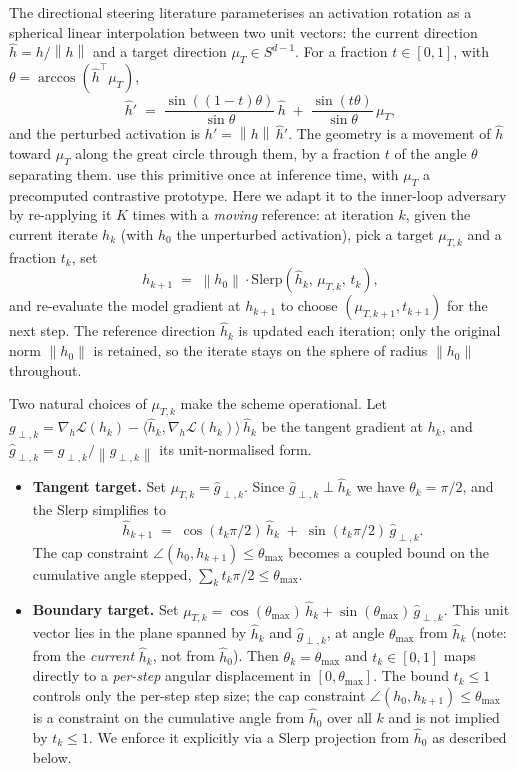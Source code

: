 \documentclass[11pt]{article}
\newcommand{\hh}{\hat h}
\newcommand{\thmax}{\theta_{\max}}
\newcommand{\norm}[1]{\left\lVert#1\right\rVert}
\newcommand{\inner}[2]{\langle #1, #2 \rangle}
\begin{document}
The directional steering literature \citep{you2026spherical} parameterises an activation rotation as a spherical linear interpolation \citep{shoemake1985slerp} between two unit vectors: the current direction $\hh = h/\norm{h}$ and a target direction $\mu_T \in S^{d-1}$. For a fraction $t \in [0,1]$, with $\theta = \arccos(\hh^\top \mu_T)$,
\begin{equation*}
\hh' \;=\; \frac{\sin((1-t)\theta)}{\sin\theta}\,\hh \;+\; \frac{\sin(t\theta)}{\sin\theta}\,\mu_T,
\end{equation*}
and the perturbed activation is $h' = \norm{h}\,\hh'$. The geometry is a movement of $\hh$ toward $\mu_T$ along the great circle through them, by a fraction $t$ of the angle $\theta$ separating them. \citet{you2026spherical} use this primitive once at inference time, with $\mu_T$ a precomputed contrastive prototype. Here we adapt it to the inner-loop adversary by re-applying it $K$ times with a \emph{moving} reference: at iteration $k$, given the current iterate $h_k$ (with $h_0$ the unperturbed activation), pick a target $\mu_{T,k}$ and a fraction $t_k$, set
\begin{equation*}
h_{k+1} \;=\; \norm{h_0} \cdot \mathrm{Slerp}\!\left(\hh_k,\, \mu_{T,k},\, t_k\right),
\end{equation*}
and re-evaluate the model gradient at $h_{k+1}$ to choose $(\mu_{T,k+1}, t_{k+1})$ for the next step. The reference direction $\hh_k$ is updated each iteration; only the original norm $\norm{h_0}$ is retained, so the iterate stays on the sphere of radius $\norm{h_0}$ throughout.

Two natural choices of $\mu_{T,k}$ make the scheme operational. Let $g_{\perp,k} = \nabla_h \mathcal L(h_k) - \inner{\hh_k}{\nabla_h \mathcal L(h_k)}\,\hh_k$ be the tangent gradient at $h_k$, and $\hat g_{\perp,k} = g_{\perp,k}/\norm{g_{\perp,k}}$ its unit-normalised form.

\begin{itemize}[leftmargin=*]
\item \textbf{Tangent target.} Set $\mu_{T,k} = \hat g_{\perp,k}$. Since $\hat g_{\perp,k} \perp \hh_k$ we have $\theta_k = \pi/2$, and the Slerp simplifies to
\begin{equation*}
\hh_{k+1} \;=\; \cos(t_k\pi/2)\,\hh_k \;+\; \sin(t_k\pi/2)\,\hat g_{\perp,k}.
\end{equation*}
The cap constraint $\angle(h_0, h_{k+1}) \le \thmax$ becomes a coupled bound on the cumulative angle stepped, $\sum_k t_k \pi/2 \le \thmax$.
\item \textbf{Boundary target.} Set $\mu_{T,k} = \cos(\thmax)\,\hh_k + \sin(\thmax)\,\hat g_{\perp,k}$. This unit vector lies in the plane spanned by $\hh_k$ and $\hat g_{\perp,k}$, at angle $\thmax$ from $\hh_k$ (note: from the \emph{current} $\hh_k$, not from $\hh_0$). Then $\theta_k = \thmax$ and $t_k \in [0,1]$ maps directly to a \emph{per-step} angular displacement in $[0, \thmax]$. The bound $t_k \le 1$ controls only the per-step step size; the cap constraint $\angle(h_0, h_{k+1}) \le \thmax$ is a constraint on the cumulative angle from $\hh_0$ over all $k$ and is not implied by $t_k \le 1$. We enforce it explicitly via a Slerp projection from $\hh_0$ as described below.
\end{itemize}
\end{document}
